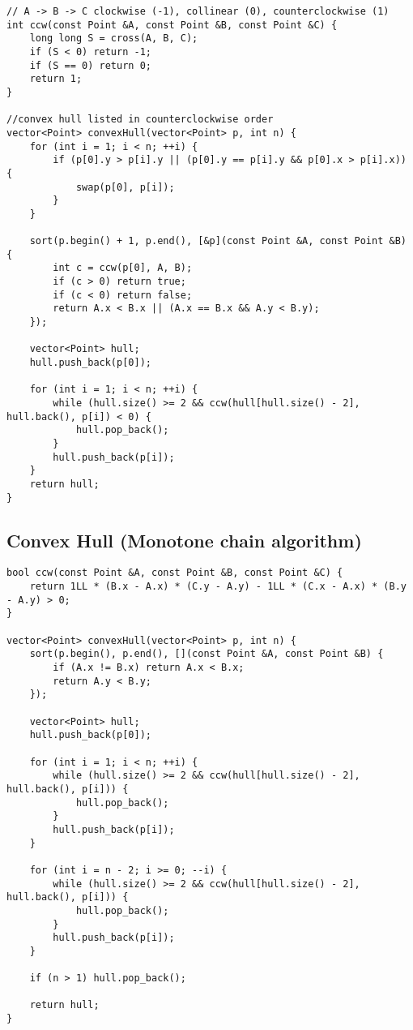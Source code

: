 \documentclass[11pt,a4paper]{article}
\begin{document}
\begin{multicols*}{2}
\begin{lstlisting}
// A -> B -> C clockwise (-1), collinear (0), counterclockwise (1)
int ccw(const Point &A, const Point &B, const Point &C) {
    long long S = cross(A, B, C);
    if (S < 0) return -1;
    if (S == 0) return 0;
    return 1;
}

//convex hull listed in counterclockwise order
vector<Point> convexHull(vector<Point> p, int n) {
    for (int i = 1; i < n; ++i) {
        if (p[0].y > p[i].y || (p[0].y == p[i].y && p[0].x > p[i].x)) {
            swap(p[0], p[i]);
        }
    }

    sort(p.begin() + 1, p.end(), [&p](const Point &A, const Point &B) {
        int c = ccw(p[0], A, B);
        if (c > 0) return true;
        if (c < 0) return false;
        return A.x < B.x || (A.x == B.x && A.y < B.y);
    });

    vector<Point> hull;
    hull.push_back(p[0]);

    for (int i = 1; i < n; ++i) {
        while (hull.size() >= 2 && ccw(hull[hull.size() - 2], hull.back(), p[i]) < 0) {
            hull.pop_back();
        }
        hull.push_back(p[i]);
    }
    return hull;
}
\end{lstlisting}

\subsection{Convex Hull (Monotone chain algorithm)}
\begin{lstlisting}
bool ccw(const Point &A, const Point &B, const Point &C) {
    return 1LL * (B.x - A.x) * (C.y - A.y) - 1LL * (C.x - A.x) * (B.y - A.y) > 0;
}

vector<Point> convexHull(vector<Point> p, int n) {
    sort(p.begin(), p.end(), [](const Point &A, const Point &B) {
        if (A.x != B.x) return A.x < B.x;
        return A.y < B.y;
    });

    vector<Point> hull;
    hull.push_back(p[0]);

    for (int i = 1; i < n; ++i) {
        while (hull.size() >= 2 && ccw(hull[hull.size() - 2], hull.back(), p[i])) {
            hull.pop_back();
        }
        hull.push_back(p[i]);
    }

    for (int i = n - 2; i >= 0; --i) {
        while (hull.size() >= 2 && ccw(hull[hull.size() - 2], hull.back(), p[i])) {
            hull.pop_back();
        }
        hull.push_back(p[i]);
    }

    if (n > 1) hull.pop_back();

    return hull;
}
\end{lstlisting}

\end{multicols*}
\end{document}
